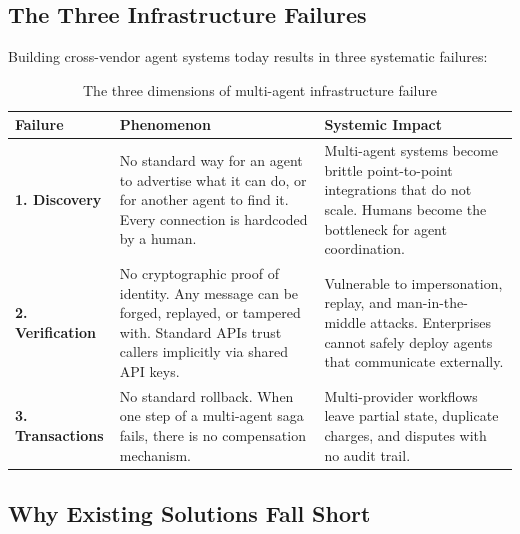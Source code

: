 \documentclass[11pt,a4paper]{article}
\begin{document}
\subsection{The Three Infrastructure Failures}

Building cross-vendor agent systems today results in three systematic failures:

\begin{table}[ht]
  \centering
  \renewcommand{\arraystretch}{1.6}
  \begin{tabularx}{\textwidth}{@{} >{\bfseries}p{2.5cm} p{5.0cm} X @{}}
    \toprule
    Failure & Phenomenon & Systemic Impact \\
    \midrule
    1. Discovery
      & No standard way for an agent to advertise what it can do, or for another
        agent to find it. Every connection is hardcoded by a human.
      & Multi-agent systems become brittle point-to-point integrations that do
        not scale. Humans become the bottleneck for agent coordination. \\
    2. Verification
      & No cryptographic proof of identity. Any message can be forged, replayed,
        or tampered with. Standard APIs trust callers implicitly via shared API keys.
      & Vulnerable to impersonation, replay, and man-in-the-middle attacks.
        Enterprises cannot safely deploy agents that communicate externally. \\
    3. Transactions
      & No standard rollback. When one step of a multi-agent saga fails,
        there is no compensation mechanism.
      & Multi-provider workflows leave partial state, duplicate charges, and
        disputes with no audit trail. \\
    \bottomrule
  \end{tabularx}
  \caption{The three dimensions of multi-agent infrastructure failure}
\end{table}

\subsection{Why Existing Solutions Fall Short}
\end{document}
